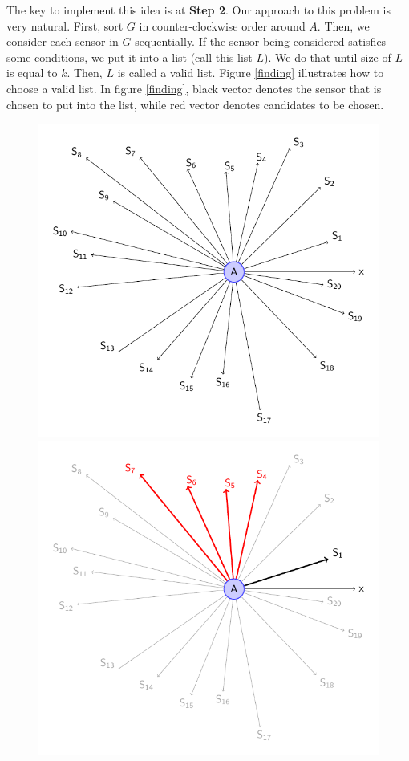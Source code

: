 The key to implement this idea is at {\bfseries Step 2}. Our approach to this problem is very natural. First, sort $G$ in counter-clockwise order around $A$. Then, we consider each sensor in $G$ sequentially. If the sensor being considered satisfies some conditions, we put it into a list (call this list $L$). We do that until size of $L$ is equal to $k$. Then, $L$ is called a valid list. Figure \ref{finding} illustrates how to choose a valid list. In figure \ref{finding}, black vector denotes the sensor that is chosen to put into the list, while red vector denotes candidates to be chosen.

\begin{figure}[h]
	\begin{minipage}{.3\linewidth}
		\includegraphics[scale=.5]{setSensors_1.pdf}
	\end{minipage}
	\hfill
	\begin{minipage}{.3\linewidth}
		\includegraphics[scale=.5]{setSensors_2.pdf}

\end{minipage}
\end{figure}
